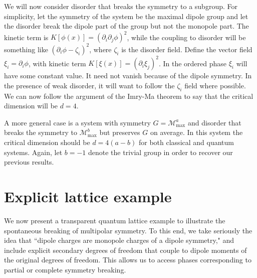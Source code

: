\documentclass[pra,aps,twocolumn, amsfonts,amsmath,amssymb,nofootinbib,superscriptaddress]{revtex4}
\newcommand{\todo}[1]{\textcolor{orange}{#1}}
\renewcommand{\max}{\text{max}}
\begin{document}
We will now consider disorder that breaks the symmetry to a subgroup. For simplicity, let the symmetry of the system be the maximal dipole group and let the disorder break the dipole part of the group but not the monopole part. The kinetic term is $K[\phi(x)]= (\partial_i \partial_j \phi)^2$, while the coupling to disorder will be something like $(\partial_i\phi - \zeta_i)^2$, where $\zeta_i$ is the disorder field. 
Define the vector field $\xi_i = \partial_i\phi$, with kinetic term $K[\xi(x)]= (\partial_i \xi_j)^2$. In the ordered phase $\xi_i$ will have some constant value. It need not vanish because of the dipole symmetry. In the presence of weak disorder, it will want to follow the $\zeta_i$ field where possible. We can now follow the argument of the Imry-Ma theorem to say that the critical dimension will be $d=4$.

A more general case is a system with symmetry $G = \mathcal{M}_\max^a$ and disorder that breaks the symmetry to $\mathcal{M}_\max^b$ but preserves $G$ on average. In this system the critical dimension should be $d=4(a-b)$ for both classical and quantum systems. Again, let $b=-1$ denote the trivial group in order to recover our previous results.


\section{Explicit lattice example} \label{sec:example}

We now present a transparent quantum lattice example to illustrate the spontaneous breaking of multipolar symmetry. To this end, we take seriously the idea that ``dipole charges are monopole charges of a dipole symmetry," and include explicit secondary degrees of freedom that couple to dipole moments of the original degrees of freedom. This allows us to access phases corresponding to partial or complete symmetry breaking. 
\end{document}
